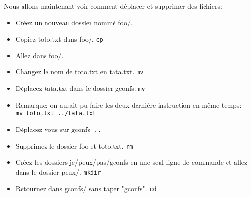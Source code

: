 \documentclass{article}
\begin{document}
Nous allons maintenant voir comment déplacer et supprimer des fichiers:
\begin{itemize}
\item Créez un nouveau dossier nommé foo/.
\item Copiez toto.txt dans foo/. \hfill \texttt{cp}
\item Allez dans foo/.
\item Changez le nom de toto.txt en tata.txt. \hfill \texttt{mv}
\item Déplacez tata.txt dans le dossier gconfs. \hfill \texttt{mv}
\item Remarque: on aurait pu faire les deux dernière instruction en même temps: \texttt{mv toto.txt ../tata.txt}
\item Déplacez vous sur gconfs. \hfill \texttt{..}
\item Supprimez le dossier foo et toto.txt. \hfill \texttt{rm}
\item Créez les dossiers je/peux/pas/gconfs en une seul ligne de commande et allez dans le dossier peux/. \hfill \texttt{mkdir}
\item Retournez dans gconfs/ sans taper "gconfs". \hfill \texttt{cd}
\end{itemize}\vspace{1em}
\end{document}
